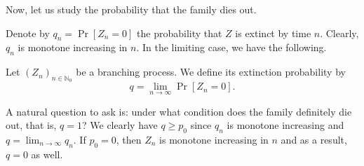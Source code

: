 Now, let us study the probability that the family dies out.

Denote by $q_n=\Pr[Z_n=0]$ the probability that $Z$ is extinct by time $n$. Clearly, $q_n$ is monotone increasing in $n$. In the limiting case, we have the following.

\begin{definition}
    Let $(Z_n)_{n\in\mathbb{N}_0}$ be a branching process. We define its extinction probability by
    $$q=\lim_{n\to\infty}\Pr[Z_n=0].$$
\end{definition}

A natural question to ask is: under what condition does the family definitely die out, that is, $q=1$? We clearly have $q\geq p_0$ since $q_n$ is monotone increasing and $q=\lim_{n\to\infty}q_n$. If $p_0=0$, then $Z_n$ is monotone increasing in $n$ and as a result, $q=0$ as well.

